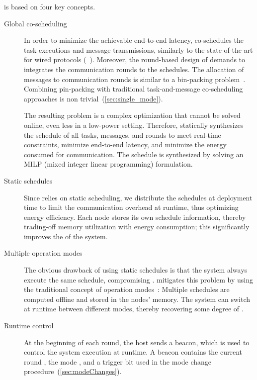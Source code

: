 \TTW is based on four key concepts.

\begin{description}

	\item [Global co-scheduling]
	In order to minimize the achievable end-to-end latency, \TTW co-schedules the task executions and message transmissions, similarly to the state-of-the-art for wired protocols (\eg~\cite{craciunas2016Combined,zhang2014Task}).
	Moreover, the round-based design of \TTnet demands to integrates the communication rounds to the schedules. The allocation of messages to communication rounds is similar to a bin-packing problem~\cite{wikipedia2019BinPacking}.
	Combining pin-packing with traditional task-and-message co-scheduling approaches is non trivial~(\cref{sec:single_mode}).

	The resulting problem is a complex optimization that cannot be solved online, even less in a low-power setting.
	Therefore, \TTW statically synthesizes the schedule of all tasks, messages, and rounds to meet real-time constraints, minimize end-to-end latency, and minimize the energy consumed for communication.
	The schedule is synthesized by solving an MILP (mixed integer linear programming) formulation.

	\item[Static schedules]
	Since \TTW relies on static scheduling, we distribute the schedules at deployment time to limit the communication overhead at runtime, thus optimizing energy efficiency.
	Each node stores its own schedule information, thereby trading-off memory utilization with energy consumption; this significantly improves the  of the system.



	\item[Multiple operation modes]
	The obvious drawback of using static schedules is that the system always execute the same schedule, compromising .
	\TTW mitigates this problem by using the traditional concept of operation modes~\cite{fohler1993changing}:
	Multiple schedules are computed offline and stored in the nodes' memory. The system can switch at runtime between different modes, thereby recovering some degree of .



	\item[Runtime control]
	At the beginning of each round, the host sends a beacon, which is used to control the system execution at runtime.
	A beacon contains the current round \id, the mode \id, and a trigger bit \SB used in the mode change procedure~(\cref{sec:modeChanges}).


\end{description}
